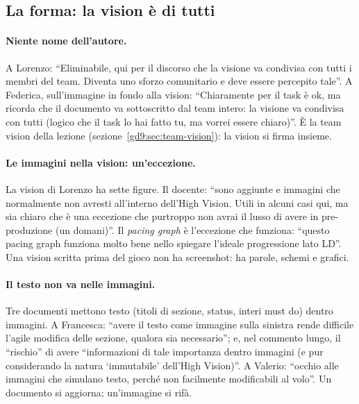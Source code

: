 \subsection{La forma: la vision è di tutti}
\label{rv:t5:sec:forma}

\paragraph{Niente nome dell'autore.} A Lorenzo: ``Eliminabile, qui per il
discorso che la visione va condivisa con tutti i membri del team. Diventa uno
sforzo comunitario e deve essere percepito tale''. A Federica, sull'immagine in
fondo alla vision: ``Chiaramente per il task è ok, ma ricorda che il
documento va sottoscritto dal team intero: la visione va condivisa con tutti
(logico che il task lo hai fatto tu, ma vorrei essere chiaro)''. È la team
vision della lezione (sezione~\ref{gd9:sec:team-vision}): la vision si firma
insieme.

\paragraph{Le immagini nella vision: un'eccezione.} La vision di Lorenzo ha
sette figure. Il docente: ``sono aggiunte e immagini che normalmente non
avresti all'interno dell'High Vision. Utili in alcuni casi qui, ma sia chiaro
che è una eccezione che purtroppo non avrai il lusso di avere in
pre-produzione (un domani)''. Il \emph{pacing graph} è l'eccezione che
funziona: ``questo pacing graph funziona molto bene nello spiegare l'ideale
progressione lato LD''. Una vision scritta prima del gioco non ha screenshot:
ha parole, schemi e grafici.

\paragraph{Il testo non va nelle immagini.} Tre documenti mettono testo
(titoli di sezione, status, interi must do) dentro immagini. A Francesca:
``avere il testo come immagine sulla sinistra rende difficile l'agile
modifica delle sezione, qualora sia necessario''; e, nel commento lungo, il
``rischio'' di avere ``informazioni di tale importanza dentro immagini (e pur
considerando la natura `immutabile' dell'High Vision)''. A Valerio: ``occhio
alle immagini che simulano testo, perché non facilmente modificabili al
volo''. Un documento si aggiorna; un'immagine si rifà.

